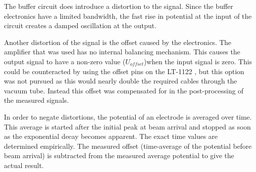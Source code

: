 The buffer circuit does introduce a distortion to the signal. Since the buffer electronics have a limited bandwidth, the fast rise in potential at the input of the circuit creates a damped oscillation at the output.

Another distortion of the signal is the offset caused by the electronics. The amplifier that was used has no internal balancing mechanism. This causes the output signal to have a non-zero value ($U_{offset}$)when the input signal is zero. This could be counteracted by using the offset pins on the LT-1122 \cite{LT1122}, but this option was not pursued as this would nearly double the required cables through the vacuum tube. Instead this offset was compensated for in the post-processing of the measured signals.

%

In order to negate distortions, the potential of an electrode is averaged over time. This average is started after the initial peak at beam arrival and stopped as soon as the exponential decay becomes apparent. The exact time values are determined empirically. The measured offset (time-average of the potential before beam arrival) is subtracted from the measured average potential to give the actual result.

